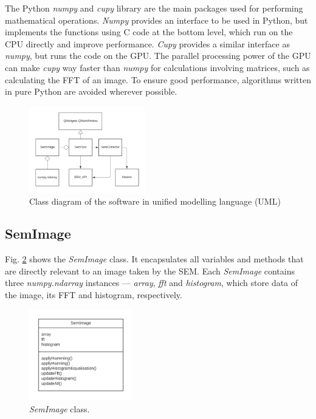 \documentclass[conference]{IEEEtran}
\begin{document}
The Python \textit{numpy} and \textit{cupy} library are the main packages used for performing mathematical operations. \textit{Numpy} provides an interface to be used in Python, but implements the functions using C code at the bottom level, which run on the CPU directly and improve performance. \textit{Cupy} provides a similar interface as \textit{numpy}, but runs the code on the GPU. The parallel processing power of the GPU can make \textit{cupy} way faster than \textit{numpy} for calculations involving matrices, such as calculating the FFT of an image. To ensure good performance, algorithms written in pure Python are avoided wherever possible.

\begin{figure}[htbp]
    \centering
    \includegraphics[width=0.45\textwidth]{Images/Software classes.png}
    \caption{Class diagram of the software in unified modelling language (UML)}
    \label{Software classes}
\end{figure}

\subsection{SemImage}
Fig. \ref{Software SemImage} shows the \textit{SemImage} class. It encapsulates all variables and methods that are directly relevant to an image taken by the SEM. Each \textit{SemImage} contains three \textit{numpy.ndarray} instances --- \textit{array}, \textit{fft} and \textit{histogram}, which store data of the image, its FFT and histogram, respectively.

\begin{figure}[htbp]
    \centering
    \includegraphics[width=0.4\textwidth]{Images/Software SemImage.png}
    \caption{\textit{SemImage} class.}
    \label{Software SemImage}
\end{figure}
\end{document}
